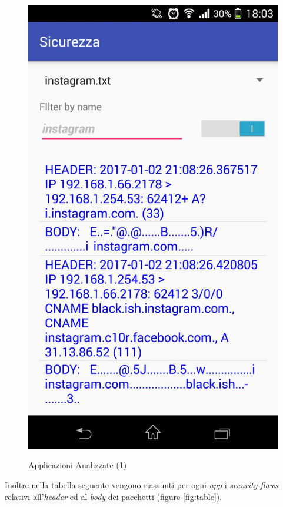 \documentclass[12pt]{article} %
\begin{document}
\begin{figure}[htbp]
{\includegraphics[scale=0.25]{./instagram.jpeg}}
\caption{Applicazioni Analizzate (1)\label{fig:app1}}
\end{figure} 

Inoltre nella tabella seguente vengono riassunti per ogni \textit{app} i \textit{security flaws} relativi all'\textit{header} ed al \textit{body} dei pacchetti (figure \ref{fig:table}).
\end{document}
